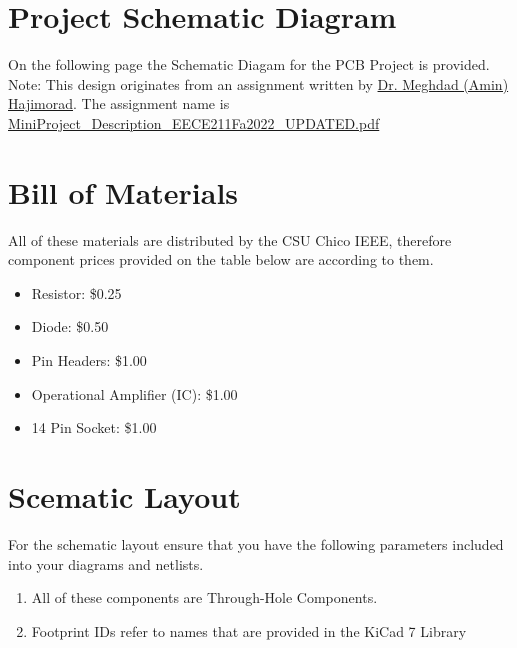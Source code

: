 \documentclass[12pt, letterpaper]{article}
\begin{document}
\section{Project Schematic Diagram}
On the following page the Schematic Diagam for the PCB Project is provided.\\
Note: This design originates from an assignment written by \href{https://www.csuchico.edu/eece/faculty-staff/faculty/meghdad-hajimorad.shtml}{Dr. Meghdad (Amin) Hajimorad}. The assignment name is \href{run:./assets/MiniProject_Description_EECE211Fa2022_UPDATED.pdf}{MiniProject\_Description\_EECE211Fa2022\_UPDATED.pdf}\\



\section{Bill of Materials}
All of these materials are distributed by the CSU Chico IEEE, therefore component prices provided on the table below are according to them.\\
\begin{itemize}
    \item Resistor: \$0.25
    \item Diode: \$0.50
    \item Pin Headers: \$1.00
    \item Operational Amplifier (IC): \$1.00
    \item 14 Pin Socket: \$1.00
\end{itemize}

\section{Scematic Layout}
For the schematic layout ensure that you have the following parameters included into your diagrams and netlists.

\begin{enumerate}
    \item All of these components are Through-Hole Components.
    \item Footprint IDs refer to names that are provided in the KiCad 7 Library
\end{enumerate}
\end{document}
